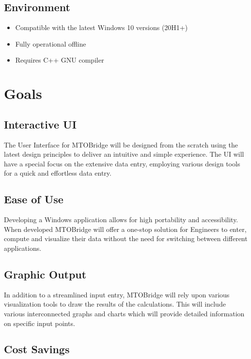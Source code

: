 \documentclass{article}
\begin{document}
\subsection{Environment}
\begin{itemize}
  \item Compatible with the latest Windows 10 versions (20H1+)
  \item Fully operational offline 
  \item Requires C++ GNU compiler 
\end{itemize}

\section{Goals}

\subsection {Interactive UI}

The User Interface for MTOBridge will be designed from the scratch using the latest design principles to deliver an intuitive and simple experience. The UI will have a special focus on the extensive data entry, employing various design tools for a quick and effortless data entry. 

\subsection {Ease of Use}

Developing a Windows application allows for high portability and accessibility. When developed MTOBridge will offer a one-stop solution for Engineers to enter, compute and visualize their data without the need for switching between different applications. 

\subsection {Graphic Output}

In addition to a streamlined input entry, MTOBridge will rely upon various visualization tools to draw the results of the calculations. This will include various interconnected graphs and charts which will provide detailed information on specific input points.

\subsection {Cost Savings}
\end{document}

